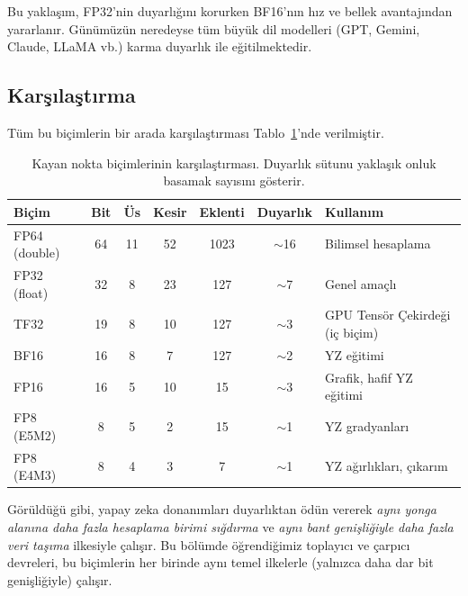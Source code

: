 Bu yaklaşım, FP32'nin duyarlığını korurken BF16'nın hız ve bellek avantajından yararlanır. Günümüzün neredeyse tüm büyük dil modelleri (GPT, Gemini, Claude, LLaMA vb.) karma duyarlık ile eğitilmektedir.

\subsection{Karşılaştırma}

Tüm bu biçimlerin bir arada karşılaştırması Tablo~\ref{tab:yapay-zeka-kn-bicimleri}'nde verilmiştir.

\begin{table}[htbp]
\centering
\caption[Kayan nokta biçimlerinin karşılaştırması]{Kayan nokta biçimlerinin karşılaştırması. Duyarlık sütunu yaklaşık onluk basamak sayısını gösterir.}
\label{tab:yapay-zeka-kn-bicimleri}
\small
\begin{tabularx}{\textwidth}{l c c c c c X}
\toprule
\textbf{Biçim} & \textbf{Bit} & \textbf{Üs} & \textbf{Kesir} & \textbf{Eklenti} & \textbf{Duyarlık} & \textbf{Kullanım} \\
\midrule
FP64 (double) & 64 & 11 & 52 & 1023 & $\sim$16 & Bilimsel hesaplama \\
FP32 (float)  & 32 & 8  & 23 & 127  & $\sim$7  & Genel amaçlı \\
TF32          & 19 & 8  & 10 & 127  & $\sim$3  & GPU Tensör Çekirdeği (iç biçim) \\
BF16          & 16 & 8  & 7  & 127  & $\sim$2  & YZ eğitimi \\
FP16          & 16 & 5  & 10 & 15   & $\sim$3  & Grafik, hafif YZ eğitimi \\
FP8 (E5M2)    & 8  & 5  & 2  & 15   & $\sim$1  & YZ gradyanları \\
FP8 (E4M3)    & 8  & 4  & 3  & 7    & $\sim$1  & YZ ağırlıkları, çıkarım \\
\bottomrule
\end{tabularx}
\end{table}

Görüldüğü gibi, yapay zeka donanımları duyarlıktan ödün vererek \emph{aynı yonga alanına daha fazla hesaplama birimi sığdırma} ve \emph{aynı bant genişliğiyle daha fazla veri taşıma} ilkesiyle çalışır. Bu bölümde öğrendiğimiz toplayıcı ve çarpıcı devreleri, bu biçimlerin her birinde aynı temel ilkelerle (yalnızca daha dar bit genişliğiyle) çalışır.


